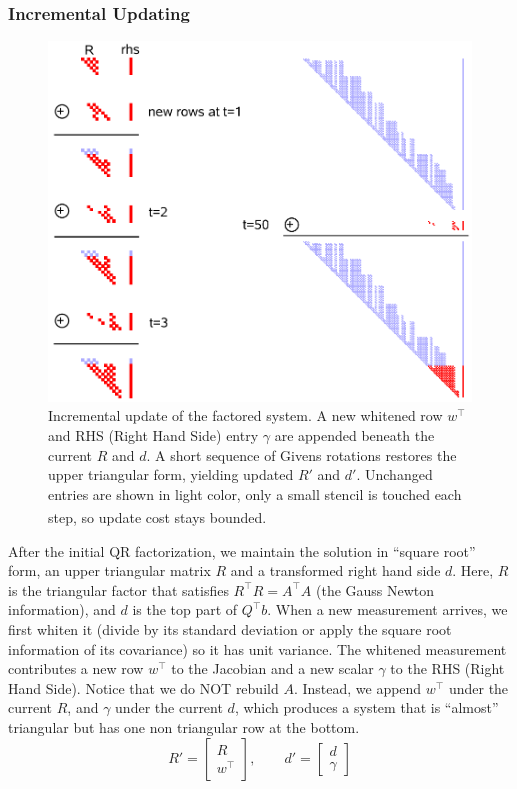 \subsubsection{Incremental Updating}
\begin{figure}[H]
    \centering
    \includegraphics[width=0.5\linewidth]{Pictures/Optimizers/iSAM/R_Matrix_Update_Step.png}
    \caption{Incremental update of the factored system. A new whitened row $w^\top$ and RHS (Right Hand Side) entry $\gamma$ are appended beneath the current $R$ and $d$. A short sequence of Givens rotations restores the upper triangular form, yielding updated $R'$ and $d'$. Unchanged entries are shown in light color, only a small stencil is touched each step, so update cost stays bounded.\textsuperscript{\cite{iSAM_paper}}}
    \label{fig:R-matrix-update-step}
\end{figure}
\noindent
After the initial QR factorization, we maintain the solution in ``square root'' form, an upper triangular matrix $R$ and a transformed right hand side $d$. Here, $R$ is the triangular factor that satisfies $R^\top R = A^\top A$ (the Gauss Newton information), and $d$ is the top part of $Q^\top b$. When a new measurement arrives, we first whiten it (divide by its standard deviation or apply the square root information of its covariance) so it has unit variance. The whitened measurement contributes a new row $w^\top$ to the Jacobian and a new scalar $\gamma$ to the RHS (Right Hand Side). Notice that we do NOT rebuild $A$. Instead, we append $w^\top$ under the current $R$, and $\gamma$ under the current $d$, which produces a system that is ``almost'' triangular but has one non triangular row at the bottom.
$$
    R' = \begin{bmatrix} R\\ w^\top \end{bmatrix},\qquad
    d' = \begin{bmatrix} d\\ \gamma \end{bmatrix}
$$
